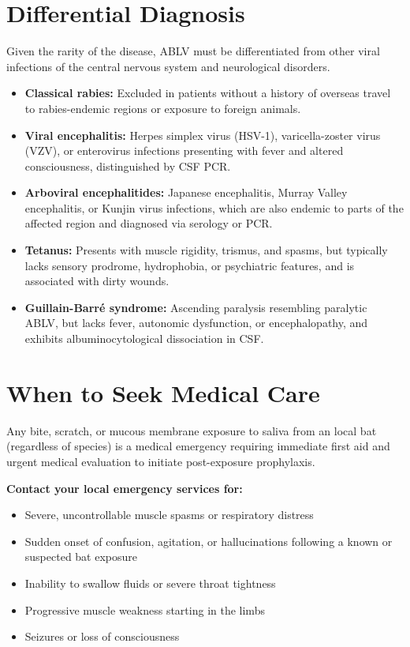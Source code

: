 \section*{Differential Diagnosis}
Given the rarity of the disease, ABLV must be differentiated from other viral infections of the central nervous system and neurological disorders.
\begin{itemize}
    \item \textbf{Classical rabies:} Excluded in patients without a history of overseas travel to rabies-endemic regions or exposure to foreign animals.
    \item \textbf{Viral encephalitis:} Herpes simplex virus (HSV-1), varicella-zoster virus (VZV), or enterovirus infections presenting with fever and altered consciousness, distinguished by CSF PCR.
    \item \textbf{Arboviral encephalitides:} Japanese encephalitis, Murray Valley encephalitis, or Kunjin virus infections, which are also endemic to parts of the affected region and diagnosed via serology or PCR.
    \item \textbf{Tetanus:} Presents with muscle rigidity, trismus, and spasms, but typically lacks sensory prodrome, hydrophobia, or psychiatric features, and is associated with dirty wounds.
    \item \textbf{Guillain-Barré syndrome:} Ascending paralysis resembling paralytic ABLV, but lacks fever, autonomic dysfunction, or encephalopathy, and exhibits albuminocytological dissociation in CSF.
\end{itemize}

\section*{When to Seek Medical Care}
Any bite, scratch, or mucous membrane exposure to saliva from an local bat (regardless of species) is a medical emergency requiring immediate first aid and urgent medical evaluation to initiate post-exposure prophylaxis.

\textbf{Contact your local emergency services for:}
\begin{itemize}
    \item Severe, uncontrollable muscle spasms or respiratory distress
    \item Sudden onset of confusion, agitation, or hallucinations following a known or suspected bat exposure
    \item Inability to swallow fluids or severe throat tightness
    \item Progressive muscle weakness starting in the limbs
    \item Seizures or loss of consciousness
\end{itemize}

